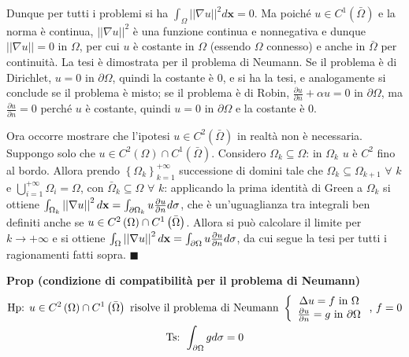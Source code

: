 \documentclass{article}
\begin{document}
Dunque per tutti i problemi si ha $\int_{\Omega }\left\vert \left\vert
\nabla u\right\vert \right\vert ^{2}d\mathbf{x}=0$. Ma poich\'{e} $u\in
C^{1}\left( \bar{\Omega}\right) $ e la norma \`{e} continua, $\left\vert
\left\vert \nabla u\right\vert \right\vert ^{2}$ \`{e} una funzione continua
e nonnegativa e dunque $\left\vert \left\vert \nabla u\right\vert
\right\vert =0$ in $\Omega $, per cui $u$ \`{e} costante in $\Omega $
(essendo $\Omega $ connesso) e anche in $\bar{\Omega}$ per continuit\`{a}.
La tesi \`{e} dimostrata per il problema di Neumann. Se il problema \`{e} di
Dirichlet, $u=0$ in $\partial \Omega $, quindi la costante \`{e} $0$, e si
ha la tesi, e analogamente si conclude se il problema \`{e} misto; se il
problema \`{e} di Robin, $\frac{\partial u}{\partial n}+\alpha u=0$ in $%
\partial \Omega $, ma $\frac{\partial u}{\partial n}=0$ perch\'{e} $u$ \`{e}
costante, quindi $u=0$ in $\partial \Omega $ e la costante \`{e} $0$.

Ora occorre mostrare che l'ipotesi $u\in C^{2}\left( \bar{\Omega}\right) $
in realt\`{a} non \`{e} necessaria. Suppongo solo che $u\in C^{2}\left(
\Omega \right) \cap C^{1}\left( \bar{\Omega}\right) $. Considero $\Omega
_{k}\subseteq \Omega $: in $\Omega _{k}$ $u$ \`{e} $C^{2}$ fino al bordo.
Allora prendo $\left\{ \Omega _{k}\right\} _{k=1}^{+\infty }$ successione di
domini tale che $\Omega _{k}\subseteq \Omega _{k+1}$ $\forall $ $k$ e $%
\bigcup_{i=1}^{+\infty }\Omega _{i}=\Omega $, con $\bar{\Omega}_{k}\subseteq
\Omega $ $\forall $ $k$: applicando la prima identit\`{a} di Green a $\Omega
_{k}$ si ottiene $\int_{\Omega _{k}}\left\vert \left\vert \nabla
u\right\vert \right\vert ^{2}d\mathbf{x}=\int_{\partial \Omega _{k}}u\frac{%
\partial u}{\partial n}d\sigma $, che \`{e} un'uguaglianza tra integrali ben
definiti anche se $u\in C^{2}\left( \Omega \right) \cap C^{1}\left( \bar{%
\Omega}\right) $. Allora si pu\`{o} calcolare il limite per $k\rightarrow
+\infty $ e si ottiene $\int_{\Omega }\left\vert \left\vert \nabla
u\right\vert \right\vert ^{2}d\mathbf{x}=\int_{\partial \Omega }u\frac{%
\partial u}{\partial n}d\sigma $, da cui segue la tesi per tutti i
ragionamenti fatti sopra. $\blacksquare $

\textbf{Prop (condizione di compatibilit\`{a} per il problema di Neumann)}%
\begin{gather*}
\text{Hp}\text{: }u\in C^{2}\left( \Omega \right) \cap C^{1}\left( \bar{%
\Omega}\right) \text{ risolve il problema di Neumann }\left\{ 
\begin{array}{c}
\Delta u=f\text{ in }\Omega \\ 
\frac{\partial u}{\partial n}=g\text{ in }\partial \Omega%
\end{array}%
\right. \text{, }f=0 \\
\text{Ts}\text{: }\int_{\partial \Omega }gd\sigma =0
\end{gather*}
\end{document}
